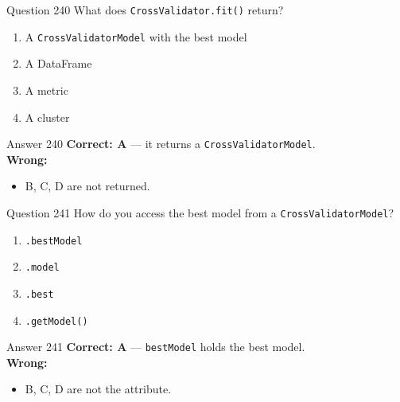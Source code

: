 \documentclass[aspectratio=169,11pt]{beamer}
\begin{document}
	\begin{frame}{Question 240}
		What does \texttt{CrossValidator.fit()} return?
		\begin{enumerate}[label=\Alph*.]
			\item A \texttt{CrossValidatorModel} with the best model
			\item A DataFrame
			\item A metric
			\item A cluster
		\end{enumerate}
	\end{frame}
	\begin{frame}{Answer 240}
		\textbf{Correct: A} --- it returns a \texttt{CrossValidatorModel}.\\
		\vspace{0.5em}
		\textbf{Wrong:}
		\begin{itemize}
			\item B, C, D are not returned.
		\end{itemize}
	\end{frame}
	
	\begin{frame}{Question 241}
		How do you access the best model from a \texttt{CrossValidatorModel}?
		\begin{enumerate}[label=\Alph*.]
			\item \texttt{.bestModel}
			\item \texttt{.model}
			\item \texttt{.best}
			\item \texttt{.getModel()}
		\end{enumerate}
	\end{frame}
	\begin{frame}{Answer 241}
		\textbf{Correct: A} --- \texttt{bestModel} holds the best model.\\
		\vspace{0.5em}
		\textbf{Wrong:}
		\begin{itemize}
			\item B, C, D are not the attribute.
		\end{itemize}
	\end{frame}
	
\end{document}
